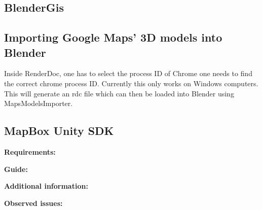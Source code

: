 \subsection{BlenderGis}

 \subsection{Importing Google Maps' 3D models into Blender}
 Inside RenderDoc, one has to select the process ID of Chrome one needs to find the correct chrome process ID. Currently this only works on Windows computers. This will generate an rdc file which can then be loaded into Blender using MapsModelsImporter\cite{}. 
 
 \subsection{MapBox Unity SDK}
 \textbf{Requirements:}
 
 \textbf{Guide:}
 
 \textbf{Additional information:}
 
 \textbf{Observed issues:}